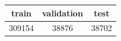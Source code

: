 \begin{tabular}{ccc}
\toprule
train & validation & test \\
\midrule
309154 & 38876 & 38702 \\
\bottomrule
\end{tabular}
